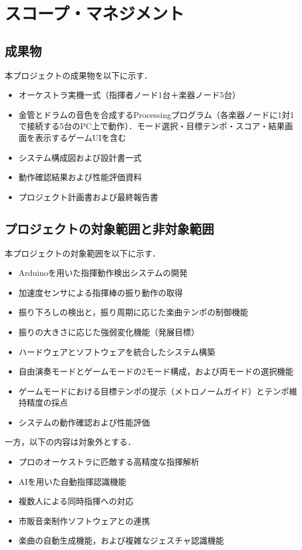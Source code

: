 \documentclass[lualatex,book,paper=a4paper,jafontsize=11.5pt,jafontscale=1.05]{jlreq}
\begin{document}
\section{スコープ・マネジメント}\label{sec:scope}

\subsection{成果物}
本プロジェクトの成果物を以下に示す．
\begin{itemize}
  \item オーケストラ実機一式（指揮者ノード1台＋楽器ノード5台）
  \item 金管とドラムの音色を合成するProcessingプログラム（各楽器ノードに1対1で接続する5台のPC上で動作）．モード選択・目標テンポ・スコア・結果画面を表示するゲームUIを含む
  \item システム構成図および設計書一式
  \item 動作確認結果および性能評価資料
  \item プロジェクト計画書および最終報告書
\end{itemize}

\subsection{プロジェクトの対象範囲と非対象範囲}
本プロジェクトの対象範囲を以下に示す．
\begin{itemize}
  \item Arduinoを用いた指揮動作検出システムの開発
  \item 加速度センサによる指揮棒の振り動作の取得
  \item 振り下ろしの検出と，振り周期に応じた楽曲テンポの制御機能
  \item 振りの大きさに応じた強弱変化機能（発展目標）
  \item ハードウェアとソフトウェアを統合したシステム構築
  \item 自由演奏モードとゲームモードの2モード構成，および両モードの選択機能
  \item ゲームモードにおける目標テンポの提示（メトロノームガイド）とテンポ維持精度の採点
  \item システムの動作確認および性能評価
\end{itemize}
一方，以下の内容は対象外とする．
\begin{itemize}
  \item プロのオーケストラに匹敵する高精度な指揮解析
  \item AIを用いた自動指揮認識機能
  \item 複数人による同時指揮への対応
  \item 市販音楽制作ソフトウェアとの連携
  \item 楽曲の自動生成機能，および複雑なジェスチャ認識機能
\end{itemize}
\end{document}
